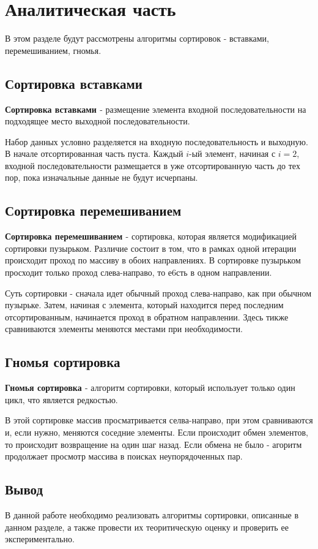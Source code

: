 \chapter{Аналитическая часть}
В этом разделе будут рассмотрены алгоритмы сортировок - вставками, перемешиванием, гномья.

\section{Сортировка вставками}
\textbf{Сортировка вставками \cite{insertion-sort}} - размещение элемента входной последовательности на подходящее место выходной последовательности.

Набор данных условно разделяется на входную последовательность и выходную. В начале отсортированная часть пуста. Каждый $i$-ый элемент, начиная с $i = 2$, входной последовательности размещается в уже отсортированную часть до тех пор, пока изначальные данные не будут исчерпаны.


\section{Сортировка перемешиванием}
\textbf{Сортировка перемешиванием \cite{sheyker-sort}} - сортировка, которая является модификацией сортировки пузырьком. Различие состоит в том, что в рамках одной итерации происходит проход по массиву в обоих направлениях. В сортировке пузырьком просходит только проход слева-направо, то е6сть в одном направлении.

Суть сортировки - сначала идет обычный проход слева-направо, как при обычном пузырьке. Затем, начиная с элемента, который находится перед последним отсортированным, начинается проход в обратном направлении. Здесь тикже сравниваются элементы меняются местами при необходимости.


\section{Гномья сортировка}
\textbf{Гномья сортировка \cite{gnomme-sort}} - алгоритм сортировки, который использует только один цикл, что является редкостью.

В этой сортировке массив просматривается селва-направо, при этом сравниваются и, если нужно, меняются соседние элементы. Если происходит обмен элементов, то происходит возвращение на один шаг назад. Если обмена не было - агоритм продолжает просмотр массива в поисках неупорядоченных пар.

\section*{Вывод}
В данной работе необходимо реализовать алгоритмы сортировки, описанные в данном разделе, а также провести их теоритическую оценку и проверить ее экспериментально.